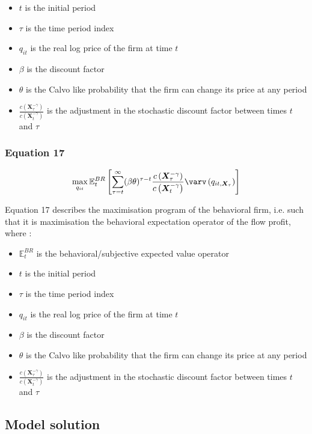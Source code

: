 \documentclass{article}
\begin{document}
\begin{itemize}
    \item $t$ is the initial period 
    \item $\tau$ is the time period index  
    \item $q_{it}$ is the real log price of the firm at time $t$
    \item $\beta$ is the discount factor
    \item $\theta$ is the Calvo like probability that the firm can change its price at any period
    \item $\frac{c\left(\bm{X}_{\tau}^{-\gamma}\right)}{c\left(\bm{X}_{t}^{-\gamma}\right)}$ is the adjustment in the stochastic discount factor between times $t$ and $\tau$
\end{itemize}

\subsubsection*{Equation 17}
\begin{equation}
    \max_{q_{it}}{\mathbb{E}_{t}^{BR} \left[\sum_{\tau=t}^{\infty}(\beta\theta)^{\tau-t}\frac{c\left(\bm{X}_{\tau}^{-\gamma}\right)}{c\left(\bm{X}_{t}^{-\gamma}\right)} \varv\left(q_{it,\bm{X}_{\tau}}\right) \right]}
\end{equation}

Equation 17 describes the maximisation program of the behavioral firm, i.e. such that it is maximisation the behavioral expectation operator of the flow profit, where : 
\begin{itemize}
    \item $\mathbb{E}_{t}^{BR}$ is the behavioral/subjective expected value operator 
    \item $t$ is the initial period 
    \item $\tau$ is the time period index  
    \item $q_{it}$ is the real log price of the firm at time $t$
    \item $\beta$ is the discount factor
    \item $\theta$ is the Calvo like probability that the firm can change its price at any period
    \item $\frac{c\left(\bm{X}_{\tau}^{-\gamma}\right)}{c\left(\bm{X}_{t}^{-\gamma}\right)}$ is the adjustment in the stochastic discount factor between times $t$ and $\tau$
\end{itemize}

\subsection{Model solution}
\end{document}
